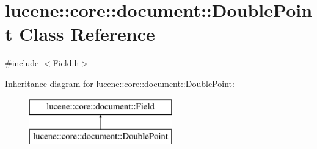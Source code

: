 \hypertarget{classlucene_1_1core_1_1document_1_1DoublePoint}{}\section{lucene\+:\+:core\+:\+:document\+:\+:Double\+Point Class Reference}
\label{classlucene_1_1core_1_1document_1_1DoublePoint}


{\ttfamily \#include $<$Field.\+h$>$}

Inheritance diagram for lucene\+:\+:core\+:\+:document\+:\+:Double\+Point\+:\begin{figure}[H]
\begin{center}
\leavevmode
\includegraphics[height=2.000000cm]{classlucene_1_1core_1_1document_1_1DoublePoint}
\end{center}
\end{figure}

